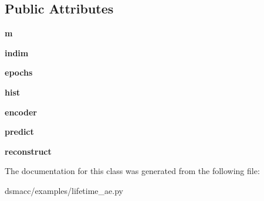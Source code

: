 \subsection*{Public Attributes}
\begin{DoxyCompactItemize}
\item 
\mbox{\label{classdsmacc_1_1examples_1_1lifetime__ae_1_1rateae_a6d44eeaecc9b06ee7326ce05485e9fc6}} 
{\bfseries m}
\item 
\mbox{\label{classdsmacc_1_1examples_1_1lifetime__ae_1_1rateae_a532e358b5bbc5bab76ae56ebde9af633}} 
{\bfseries indim}
\item 
\mbox{\label{classdsmacc_1_1examples_1_1lifetime__ae_1_1rateae_ad94b4bffe363e64bb75e56c4292c7147}} 
{\bfseries epochs}
\item 
\mbox{\label{classdsmacc_1_1examples_1_1lifetime__ae_1_1rateae_ab2b1608c23476ff20b1409996beabdae}} 
{\bfseries hist}
\item 
\mbox{\label{classdsmacc_1_1examples_1_1lifetime__ae_1_1rateae_a31ec56d027f87ec1f3839be14c0c62ff}} 
{\bfseries encoder}
\item 
\mbox{\label{classdsmacc_1_1examples_1_1lifetime__ae_1_1rateae_a8d1acc263ca389ba94b2ee0efe8659f7}} 
{\bfseries predict}
\item 
\mbox{\label{classdsmacc_1_1examples_1_1lifetime__ae_1_1rateae_a0119bcc3a6989a69563b6cc7c08f47a4}} 
{\bfseries reconstruct}
\end{DoxyCompactItemize}


The documentation for this class was generated from the following file\+:\begin{DoxyCompactItemize}
\item 
dsmacc/examples/lifetime\+\_\+ae.\+py\end{DoxyCompactItemize}
